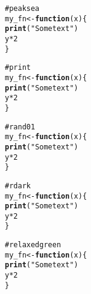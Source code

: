 \documentclass[12pt]{article}\usepackage{graphicx, color}
\makeatletter
\newcommand{\hlfunctioncall}[1]{\textcolor[rgb]{0.188235294117647,0.650980392156863,0.188235294117647}{\textbf{#1}}}%
\newcommand{\hlstring}[1]{\textcolor[rgb]{0.850980392156863,1,0.466666666666667}{#1}}%
\newcommand{\hlcomment}[1]{\textcolor[rgb]{0.533333333333333,0.533333333333333,0.533333333333333}{#1}}%
\newenvironment{kframe}{%
 \def\at@end@of@kframe{}%
 \ifinner\ifhmode%
  \def\at@end@of@kframe{\end{minipage}}%
  \begin{minipage}{\columnwidth}%
 \fi\fi%
 \def\FrameCommand##1{\hskip\@totalleftmargin \hskip-\fboxsep
 \colorbox{shadecolor}{##1}\hskip-\fboxsep
     \hskip-\linewidth \hskip-\@totalleftmargin \hskip\columnwidth}%
 \MakeFramed {\advance\hsize-\width
   \@totalleftmargin\z@ \linewidth\hsize
   \@setminipage}}%
 {\par\unskip\endMakeFramed%
 \at@end@of@kframe}
\newenvironment{knitrout}{}{} %
\makeatother
\begin{document}
\begin{knitrout}
\color{fgcolor}\begin{kframe}
\begin{alltt}
\hlcomment{# peaksea}
my_fn <- \hlfunctioncall{function}(x) \{
    \hlfunctioncall{print}(\hlstring{"Some text"})
    y * 2
\}
\end{alltt}
\end{kframe}
\end{knitrout}





\begin{knitrout}
\color{fgcolor}\begin{kframe}
\begin{alltt}
\hlcomment{# print}
my_fn <- \hlfunctioncall{function}(x) \{
    \hlfunctioncall{print}(\hlstring{"Some text"})
    y * 2
\}
\end{alltt}
\end{kframe}
\end{knitrout}





\begin{knitrout}
\color{fgcolor}\begin{kframe}
\begin{alltt}
\hlcomment{# rand01}
my_fn <- \hlfunctioncall{function}(x) \{
    \hlfunctioncall{print}(\hlstring{"Some text"})
    y * 2
\}
\end{alltt}
\end{kframe}
\end{knitrout}





\begin{knitrout}
\color{fgcolor}\begin{kframe}
\begin{alltt}
\hlcomment{# rdark}
my_fn <- \hlfunctioncall{function}(x) \{
    \hlfunctioncall{print}(\hlstring{"Some text"})
    y * 2
\}
\end{alltt}
\end{kframe}
\end{knitrout}





\begin{knitrout}
\color{fgcolor}\begin{kframe}
\begin{alltt}
\hlcomment{# relaxedgreen}
my_fn <- \hlfunctioncall{function}(x) \{
    \hlfunctioncall{print}(\hlstring{"Some text"})
    y * 2
\}
\end{alltt}
\end{kframe}
\end{knitrout}
\end{document}
